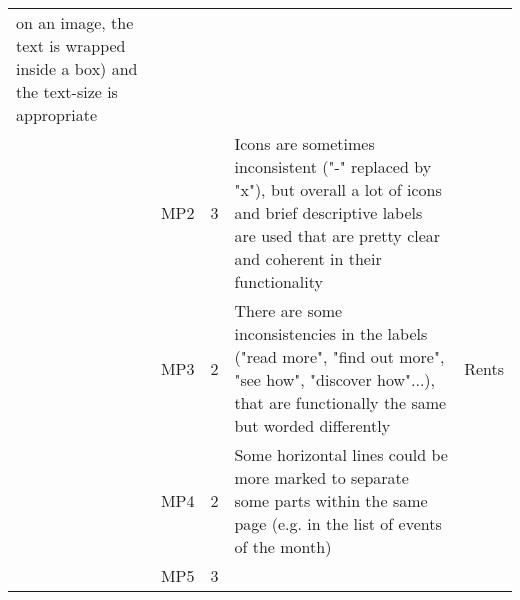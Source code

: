\begin{tabularx}{\linewidth}{l c c X p{3cm}}
on an image, the text is wrapped inside
a box) and the
text-size is appropriate & \\ \cmidrule{2-5} 
    & MP2 & 3 & Icons are sometimes inconsistent
    ("-" replaced by "x"),
    but overall a lot of icons and
    brief descriptive labels are used
    that are pretty clear and coherent
    in their functionality & \\ \cmidrule{2-5} 
    & MP3 & 2 & There are some inconsistencies
    in the labels ("read more", "find out more",
    "see how", "discover how"...),
    that are functionally the same
    but worded differently & Rents\\ \cmidrule{2-5} 
    & MP4 & 2 & Some horizontal lines could be more
    marked to separate some parts within
    the same page (e.g. in the list of events
    of the month) &\\ \cmidrule{2-5} 
    & MP5 & 3 & &
\end{tabularx}

